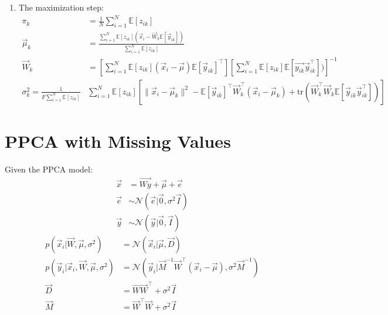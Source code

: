 \documentclass[12pt,twoside]{article}
\begin{document}
\begin{enumerate}
\item The maximization step:
\begin{align*}
\pi_k &= \frac{1}{N}\sum^N_{i=1} \mathbb{E}[z_{ik}]\\
\vec{\mu}_k &= \frac{\sum_{i=1}^N \mathbb{E}[z_{ik}](\vec{x}_i - \vec{W}_k \mathbb{E}[\vec{y}_{ik}])} {\sum_{i=1}^N \mathbb{E}[z_{ik}]}\\
\vec{W}_k & = \left[\sum_{i=1}^N\mathbb{E}[z_{ik}](\vec{x}_i - \vec{\mu})\mathbb{E}[\vec{y}_{ik}]^\top\right]\left[\sum_{i=1}^N\mathbb{E}[z_{ik}]\mathbb{E}[\vec{y_{ik}}\vec{y}_{ik}^\top])  \right]^{-1}\\
\sigma_k^2 = \frac{1}{F\sum_{i=1}^N \mathbb{E}[z_{ik}]}&\sum_{i=1}^N \mathbb{E}[z_{ik}]\left[\parallel\vec{x}_i-\vec{\mu}_k\parallel^2 - \mathbb{E}[\vec{y}_{ik}]^\top \vec{W}^\top_k(\vec{x}_i-\vec{\mu}_k) + \text{tr}\left(\vec{W}_k^\top \vec{W}_k \mathbb{E}[\vec{y}_{ik}\vec{y}_{ik}^\top]\right)\right]
\end{align*}

\end{enumerate}

\newpage

\section{PPCA with Missing Values}
Given the PPCA model:
\begin{align*}
\vec{x} &= \vec{Wy} + \vec{\mu} + \vec{e}\\
\vec{e} & \sim \mathcal{N}(\vec{e}\vert \vec{0}, \sigma^2\vec{I})\\
\vec{y} & \sim \mathcal{N}(\vec{y}\vert \vec{0}, \vec{I})
\end{align*}
\begin{align*}
p(\vec{x}_i \vert \vec{W}, \vec{\mu}, \sigma^2)&= \mathcal{N}(\vec{x}_i\vert \vec{\mu}, \vec{D})\\
p(\vec{y}_i \vert \vec{x}_i, \vec{W}, \vec{\mu}, \sigma^2)&=\mathcal{N}(\vec{y}_i \vert \vec{M}^{-1}\vec{W}^\top (\vec{x}_i-\vec{\mu}), \sigma^2\vec{M}^{-1})\\
\vec{D} &= \vec{WW}^\top +\sigma^2\vec{I} \\
\vec{M} &= \vec{W}^\top \vec{W} +\sigma^2\vec{I}
\end{align*}
\end{document}
